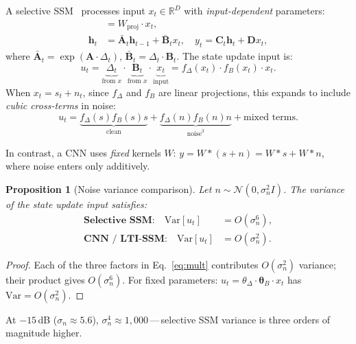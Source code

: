 \documentclass{Interspeech}
\newtheorem{proposition}{Proposition}
\begin{document}
A selective SSM~\cite{gu2024mamba} processes input $x_t \in \mathbb{R}^D$ with \emph{input-dependent} parameters:
\begin{align}
[\Delta_t, \mathbf{B}_t, \mathbf{C}_t] &= W_{\text{proj}} \cdot x_t, \label{eq:proj} \\
\mathbf{h}_t &= \bar{\mathbf{A}}_t \mathbf{h}_{t-1} + \bar{\mathbf{B}}_t x_t, \quad
y_t = \mathbf{C}_t \mathbf{h}_t + \mathbf{D} x_t, \label{eq:ssm}
\end{align}
where $\bar{\mathbf{A}}_t = \exp(\mathbf{A} \cdot \Delta_t)$, $\bar{\mathbf{B}}_t = \Delta_t \cdot \mathbf{B}_t$.
The state update input is:
\begin{equation}
u_t = \underbrace{\Delta_t}_{\text{from } x} \cdot \underbrace{\mathbf{B}_t}_{\text{from } x} \cdot \underbrace{x_t}_{\text{input}} = f_\Delta(x_t) \cdot f_B(x_t) \cdot x_t.
\label{eq:mult}
\end{equation}
When $x_t = s_t + n_t$, since $f_\Delta$ and $f_B$ are linear projections, this expands to include \emph{cubic cross-terms} in noise:
\begin{equation}
u_t = \underbrace{f_\Delta(s) f_B(s) s}_{\text{clean}} + \underbrace{f_\Delta(n) f_B(n) n}_{\text{noise}^3} + \text{mixed terms}.
\label{eq:cubic}
\end{equation}

In contrast, a CNN uses \emph{fixed} kernels $W$: $y = W \ast (s{+}n) = W{\ast}s + W{\ast}n$, where noise enters only additively.

\begin{proposition}[Noise variance comparison]
\label{prop:variance}
Let $n \sim \mathcal{N}(0, \sigma_n^2 I)$. The variance of the state update input satisfies:
\begin{align}
\textbf{Selective SSM:} \quad \mathrm{Var}[u_t] &= O(\sigma_n^6), \label{eq:var_ssm} \\
\textbf{CNN / LTI-SSM:} \quad \mathrm{Var}[u_t] &= O(\sigma_n^2). \label{eq:var_cnn}
\end{align}
\end{proposition}
\begin{proof}
Each of the three factors in Eq.~\ref{eq:mult} contributes $O(\sigma_n^2)$ variance; their product gives $O(\sigma_n^6)$.
For fixed parameters: $u_t = \theta_\Delta \cdot \bm{\theta}_B \cdot x_t$ has $\mathrm{Var} = O(\sigma_n^2)$.
\end{proof}

At $-15$\,dB ($\sigma_n \approx 5.6$), $\sigma_n^4 \approx 1{,}000$\,---\,selective SSM variance is three orders of magnitude higher.
\end{document}
